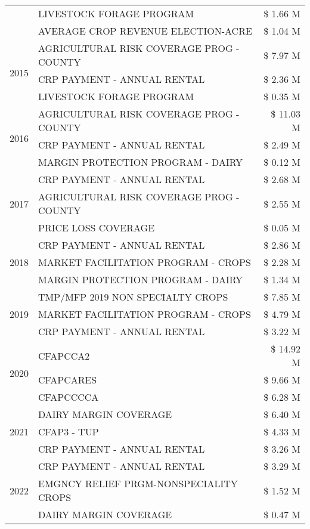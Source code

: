 \begin{tabular}{llr}
 & LIVESTOCK FORAGE PROGRAM & \$ 1.66 M \\
 & AVERAGE CROP REVENUE ELECTION-ACRE & \$ 1.04 M \\
\cline{1-3}
\multirow[t]{3}{*}{2015} & AGRICULTURAL RISK COVERAGE PROG - COUNTY & \$ 7.97 M \\
 & CRP PAYMENT - ANNUAL RENTAL & \$ 2.36 M \\
 & LIVESTOCK FORAGE PROGRAM & \$ 0.35 M \\
\cline{1-3}
\multirow[t]{3}{*}{2016} & AGRICULTURAL RISK COVERAGE PROG - COUNTY & \$ 11.03 M \\
 & CRP PAYMENT - ANNUAL RENTAL & \$ 2.49 M \\
 & MARGIN PROTECTION PROGRAM - DAIRY & \$ 0.12 M \\
\cline{1-3}
\multirow[t]{3}{*}{2017} & CRP PAYMENT - ANNUAL RENTAL & \$ 2.68 M \\
 & AGRICULTURAL RISK COVERAGE PROG - COUNTY & \$ 2.55 M \\
 & PRICE LOSS COVERAGE & \$ 0.05 M \\
\cline{1-3}
\multirow[t]{3}{*}{2018} & CRP PAYMENT - ANNUAL RENTAL & \$ 2.86 M \\
 & MARKET FACILITATION PROGRAM - CROPS & \$ 2.28 M \\
 & MARGIN PROTECTION PROGRAM - DAIRY & \$ 1.34 M \\
\cline{1-3}
\multirow[t]{3}{*}{2019} & TMP/MFP 2019 NON SPECIALTY CROPS & \$ 7.85 M \\
 & MARKET FACILITATION PROGRAM - CROPS & \$ 4.79 M \\
 & CRP PAYMENT - ANNUAL RENTAL & \$ 3.22 M \\
\cline{1-3}
\multirow[t]{3}{*}{2020} & CFAPCCA2 & \$ 14.92 M \\
 & CFAPCARES & \$ 9.66 M \\
 & CFAPCCCCA & \$ 6.28 M \\
\cline{1-3}
\multirow[t]{3}{*}{2021} & DAIRY MARGIN COVERAGE & \$ 6.40 M \\
 & CFAP3 - TUP & \$ 4.33 M \\
 & CRP PAYMENT - ANNUAL RENTAL & \$ 3.26 M \\
\cline{1-3}
\multirow[t]{3}{*}{2022} & CRP PAYMENT - ANNUAL RENTAL & \$ 3.29 M \\
 & EMGNCY RELIEF PRGM-NONSPECIALITY CROPS & \$ 1.52 M \\
 & DAIRY MARGIN COVERAGE & \$ 0.47 M \\
\cline{1-3}
\bottomrule
\end{tabular}
